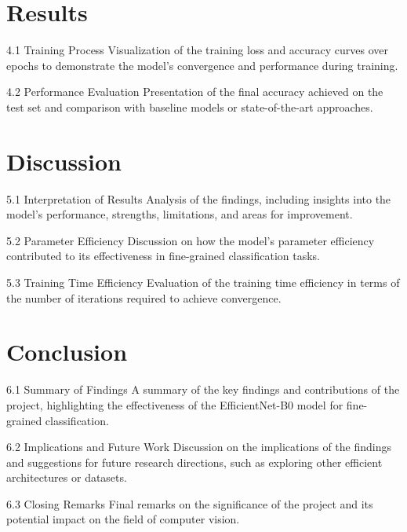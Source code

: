 \documentclass[12pt, a4paper, twoside]{article}
\begin{document}
	\section{Results}
		
		4.1 Training Process
		Visualization of the training loss and accuracy curves over epochs to demonstrate the model's convergence and performance during training.
		
		4.2 Performance Evaluation
		Presentation of the final accuracy achieved on the test set and comparison with baseline models or state-of-the-art approaches.
		
	\section{Discussion}
		
		5.1 Interpretation of Results
		Analysis of the findings, including insights into the model's performance, strengths, limitations, and areas for improvement.
		
		5.2 Parameter Efficiency
		Discussion on how the model's parameter efficiency contributed to its effectiveness in fine-grained classification tasks.
		
		5.3 Training Time Efficiency
		Evaluation of the training time efficiency in terms of the number of iterations required to achieve convergence.
		
	\section{Conclusion}
		
		6.1 Summary of Findings
		A summary of the key findings and contributions of the project, highlighting the effectiveness of the EfficientNet-B0 model for fine-grained classification.
		
		6.2 Implications and Future Work
		Discussion on the implications of the findings and suggestions for future research directions, such as exploring other efficient architectures or datasets.
		
		6.3 Closing Remarks
		Final remarks on the significance of the project and its potential impact on the field of computer vision.
		
\end{document}
